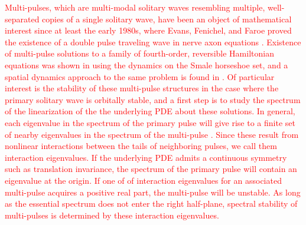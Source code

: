 \documentclass[12pt]{elsarticle}
\newcommand{\revised}[1]{ \textcolor{red}{#1} }
\begin{document}
\revised{Multi-pulses, which are multi-modal solitary waves resembling multiple, well-separated copies of a single solitary wave, have been an object of mathematical interest since at least the early 1980s, where Evans, Fenichel, and Faroe proved the existence of a double pulse traveling wave in nerve axon equations \cite{Evans1982}. Existence of multi-pulse solutions to a family of fourth-order, reversible Hamiltonian equations was shown in \cite{Buffoni1996} using the dynamics on the Smale horseshoe set, and a spatial dynamics approach to the same problem is found in \cite{SandstedeStrut}. Of particular interest is the stability of these multi-pulse structures in the case where the primary solitary wave is orbitally stable, and a first step is to study the spectrum of the linearization of the the underlying PDE about these solutions. In general, each eigenvalue in the spectrum of the primary pulse will give rise to a finite set of nearby eigenvalues in the spectrum of the multi-pulse \cite{Alexander1990,Sandstede1998}. Since these result from nonlinear interactions between the tails of neighboring pulses, we call them interaction eigenvalues. If the underlying PDE admits a continuous symmetry such as translation invariance, the spectrum of the primary pulse will contain an eigenvalue at the origin. If one of of interaction eigenvalues for an associated multi-pulse acquires a positive real part, the multi-pulse will be unstable. As long as the essential spectrum does not enter the right half-plane, spectral stability of multi-pulses is determined by these interaction eigenvalues.} 
\end{document}
